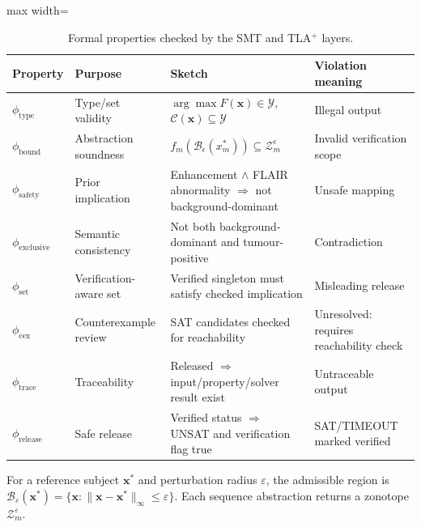 \documentclass[preprint,11pt]{elsarticle}
\newcommand{\Z}{\mathcal{Z}}
\newcommand{\Y}{\mathcal{Y}}
\newcommand{\B}{\mathcal{B}}
\newcommand{\C}{\mathcal{C}}
\newcommand{\eps}{\varepsilon}
\begin{document}
\begin{table}[H]
\centering
\caption{Formal properties checked by the SMT and TLA$^{+}$ layers.}
\label{tab:formal_properties}
\scriptsize
\begin{adjustbox}{max width=\textwidth}
\begin{tabular}{p{2.2cm}p{3.2cm}p{5.9cm}p{3.5cm}}
\toprule
\textbf{Property} & \textbf{Purpose} & \textbf{Sketch} & \textbf{Violation meaning} \\
\midrule
$\phi_{\mathrm{type}}$ & Type/set validity & $\arg\max F(\mathbf{x})\in\Y$, $\C(\mathbf{x})\subseteq\Y$ & Illegal output \\
$\phi_{\mathrm{bound}}$ & Abstraction soundness & $f_m(\B_\epsilon(x_m^*))\subseteq\Z_m^\epsilon$ & Invalid verification scope \\
$\phi_{\mathrm{safety}}$ & Prior implication & Enhancement $\wedge$ FLAIR abnormality $\Rightarrow$ not background-dominant & Unsafe mapping \\
$\phi_{\mathrm{exclusive}}$ & Semantic consistency & Not both background-dominant and tumour-positive & Contradiction \\
$\phi_{\mathrm{set}}$ & Verification-aware set & Verified singleton must satisfy checked implication & Misleading release \\
$\phi_{\mathrm{cex}}$ & Counterexample review & SAT candidates checked for reachability & Unresolved: requires reachability check \\
$\phi_{\mathrm{trace}}$ & Traceability & Released $\Rightarrow$ input/property/solver result exist & Untraceable output \\
$\phi_{\mathrm{release}}$ & Safe release & Verified status $\Rightarrow$ UNSAT and verification flag true & SAT/TIMEOUT marked verified \\
\bottomrule
\end{tabular}
\end{adjustbox}
\end{table}

For a reference subject $\mathbf{x}^{*}$ and perturbation radius $\eps$, the admissible region is $\B_{\eps}(\mathbf{x}^{*})=\{\mathbf{x}:\|\mathbf{x}-\mathbf{x}^{*}\|_{\infty}\leq \eps\}$. Each sequence abstraction returns a zonotope $\Z_m^\eps$.
\end{document}
